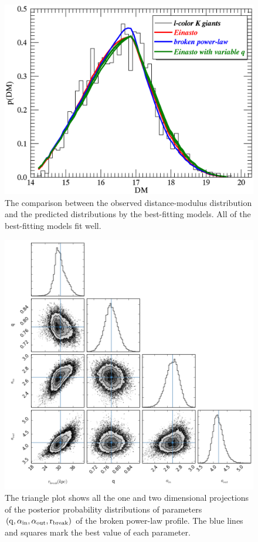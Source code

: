 \documentclass[12pt,preprint]{aastex}
\begin{document}
\begin{figure}[htbp]
\centering
\includegraphics[width=\textwidth]{pdm_hptest_allmodels}
\caption{The comparison between the observed distance-modulus distribution and the predicted distributions by the best-fitting models. All of the best-fitting models fit well.}
\label{f:fpdm}
\end{figure}
\begin{figure}[htbp]
\centering
\includegraphics[width=\textwidth]{trianglebpl}
\caption{The triangle plot shows all the one and two dimensional projections of the posterior probability distributions of parameters $\rm (q,\alpha_{in},\alpha_{out},r_{break})$ of the broken power-law profile. The blue lines and squares mark the best value of each parameter.}
\label{f:fbpl}
\end{figure}
\end{document}
